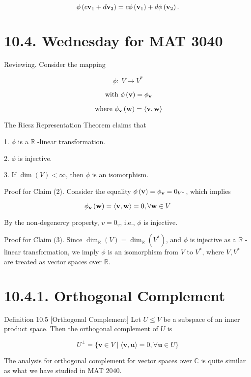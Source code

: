 \documentclass[11pt]{article}
\begin{document}
\[
\phi \left( {c{\bf v}_1 + d{\bf v}_2}\right)  = {c\phi }\left( {\bf v}_1\right)  + {d\phi }\left( {\bf v}_2\right) .
\]

\section*{10.4. Wednesday for MAT 3040}

Reviewing. Consider the mapping

\[
\phi  : \;V \rightarrow  {V}^{ * }
\]

\[
\text{ with }\phi \left( \mathbf{v}\right)  = {\phi }_{\bf v}
\]

\[
\text{ where }{\phi }_{\bf v}\left( \mathbf{w}\right)  = \langle \mathbf{v},\mathbf{w}\rangle
\]

The Riesz Representation Theorem claims that

1. \(\phi\) is a \(\mathbb{R}\) -linear transformation.

2. \(\phi\) is injective.

3. If \(\dim \left( V\right)  < \infty\), then \(\phi\) is an isomorphism.

Proof for Claim (2). Consider the equality \(\phi \left( \mathbf{v}\right)  = {\phi }_{\bf v} = {0}_{{V}^{ * }}\), which implies

\[
{\phi }_{\bf v}\left( \mathbf{w}\right)  = \langle \mathbf{v},\mathbf{w}\rangle  = 0,\forall \mathbf{w} \in  V
\]

By the non-degenercy property, \(v = {0}_{v}\), i.e., \(\phi\) is injective.

Proof for Claim (3). Since \({\dim }_{\mathbb{R}}\left( V\right)  = {\dim }_{\mathbb{R}}\left( {V}^{ * }\right)\), and \(\phi\) is injective as a \(\mathbb{R}\) -linear transformation, we imply \(\phi\) is an isomorphism from \(V\) to \({V}^{ * }\), where \(V,{V}^{ * }\) are treated as vector spaces over \(\mathbb{R}\).

\section*{10.4.1. Orthogonal Complement}

Definition 10.5 [Orthogonal Complement] Let \(U \leq  V\) be a subspace of an inner product space. Then the orthogonal complement of \(U\) is

\[
{U}^{ \bot  } = \{ \mathbf{v} \in  V \mid  \langle \mathbf{v},\mathbf{u}\rangle  = 0,\forall \mathbf{u} \in  U\}
\]

The analysis for orthogonal complement for vector spaces over \(\mathbb{C}\) is quite similar as what we have studied in MAT 2040.
\end{document}
